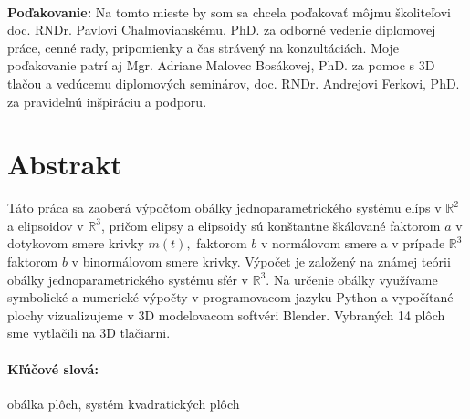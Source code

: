 \documentclass[12pt, twoside]{book}
\theoremstyle{definition}
\begin{document}

\frontmatter

\setcounter{page}{3}
\newpage 
~

\vfill
{\bf Poďakovanie:} Na tomto mieste by som sa chcela poďakovať môjmu školiteľovi
doc. RNDr. Pavlovi Chalmovianskému, PhD. za odborné vedenie diplomovej práce, cenné rady, pripomienky a čas strávený na konzultáciách. Moje poďakovanie patrí aj Mgr. Adriane Malovec Bosákovej, PhD. za pomoc s 3D tlačou a vedúcemu diplomových seminárov, doc. RNDr. Andrejovi Ferkovi, PhD. za pravidelnú inšpiráciu a podporu.


\newpage 
\section*{Abstrakt}
\noindent Táto práca sa zaoberá výpočtom obálky jednoparametrického systému elíps v $\mathbb{R}^2$ a elipsoidov v $\mathbb{R}^3$, pričom elipsy a elipsoidy sú konštantne škálované faktorom $a$ v dotykovom smere krivky $m(t),$ faktorom $b$ v normálovom smere a v prípade $\mathbb{R}^3$ faktorom $b$ v binormálovom smere krivky. Výpočet je založený na známej teórii obálky jednoparametrického systému sfér v $\mathbb{R}^3.$ Na určenie obálky využívame symbolické a numerické výpočty v programovacom jazyku Python a vypočítané plochy vizualizujeme v 3D modelovacom softvéri Blender. Vybraných 14 plôch sme vytlačili na 3D tlačiarni.

\paragraph*{Kľúčové slová:} obálka plôch, systém kvadratických plôch
\end{document}
